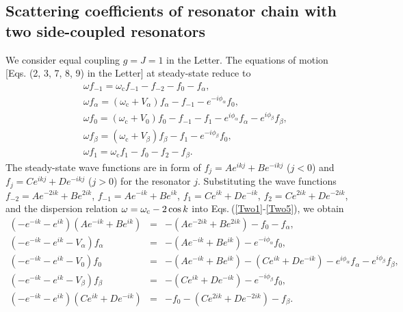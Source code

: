 \documentclass[prl,showpacs,superscriptaddress,twocolumn]{revtex4-1}
\begin{document}
\begin{widetext}
\subsection{Scattering coefficients of resonator chain with two side-coupled
resonators}

We consider equal coupling $g=J=1$ in the Letter. The equations of motion
[Eqs. (2, 3, 7, 8, 9) in the Letter] at steady-state reduce to%
\begin{eqnarray}
&&\omega f_{-1}=\omega _{\mathrm{c}}f_{-1}-f_{-2}-f_{0}-f_{\alpha },
\label{Two1} \\
&&\omega f_{\alpha }=\left( \omega _{\mathrm{c}}+V_{\alpha }\right)
f_{\alpha }-f_{-1}-e^{-i\phi _{\alpha }}f_{0},  \label{Two2} \\
&&\omega f_{0}=\left( \omega _{\mathrm{c}}+V_{0}\right)
f_{0}-f_{-1}-f_{1}-e^{i\phi _{\alpha }}f_{\alpha }-e^{i\phi _{\beta
}}f_{\beta },  \label{Two3} \\
&&\omega f_{\beta }=\left( \omega _{\mathrm{c}}+V_{\beta }\right) f_{\beta
}-f_{1}-e^{-i\phi _{\beta }}f_{0},  \label{Two4} \\
&&\omega f_{1}=\omega _{\mathrm{c}}f_{1}-f_{0}-f_{2}-f_{\beta }.
\label{Two5}
\end{eqnarray}%
The steady-state wave functions are in form of $f_{j}=Ae^{ikj}+Be^{-ikj}$ ($%
j<0$) and $f_{j}=Ce^{ikj}+De^{-ikj}$ ($j>0$) for the resonator $j$.
Substituting the wave functions $f_{-2}=Ae^{-2ik}+Be^{2ik}$, $%
f_{-1}=Ae^{-ik}+Be^{ik}$, $f_{1}=Ce^{ik}+De^{-ik}$, $%
f_{2}=Ce^{2ik}+De^{-2ik} $, and the dispersion relation $\omega =\omega _{%
\mathrm{c}}-2\cos k$ into Eqs.$~$(\ref{Two1}-\ref{Two5}), we obtain
\begin{eqnarray}
\left( -e^{-ik}-e^{ik}\right) \left( Ae^{-ik}+Be^{ik}\right) &=&-\left(
Ae^{-2ik}+Be^{2ik}\right) -f_{0}-f_{\alpha }, \\
\left( -e^{-ik}-e^{ik}-V_{\alpha }\right) f_{\alpha } &=&-\left(
Ae^{-ik}+Be^{ik}\right) -e^{-i\phi _{\alpha }}f_{0}, \\
\left( -e^{-ik}-e^{ik}-V_{0}\right) f_{0} &=&-\left( Ae^{-ik}+Be^{ik}\right)
-\left( Ce^{ik}+De^{-ik}\right) -e^{i\phi _{\alpha }}f_{\alpha }-e^{i\phi
_{\beta }}f_{\beta }, \\
\left( -e^{-ik}-e^{ik}-V_{\beta }\right) f_{\beta } &=&-\left(
Ce^{ik}+De^{-ik}\right) -e^{-i\phi _{\beta }}f_{0}, \\
\left( -e^{-ik}-e^{ik}\right) \left( Ce^{ik}+De^{-ik}\right)
&=&-f_{0}-\left( Ce^{2ik}+De^{-2ik}\right) -f_{\beta }.
\end{eqnarray}%

\end{widetext}
\end{document}
